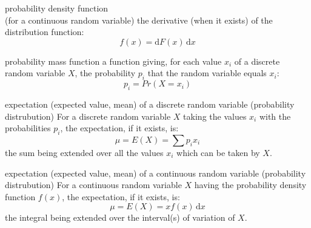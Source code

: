 \documentclass[avery5371,grid]{flashcards}
\begin{document}
\begin{flashcard}[Definition]{probability density function \\ (for a continuous random variable)}
\vspace{\fill}
    the derivative (when it exists) of the distribution function:
    \begin{equation*}
        f(x) = \mathrm{d}F(x)\,\mathrm{d}x
    \end{equation*}
\vspace{\fill}
\end{flashcard}

\begin{flashcard}[Definition]{probability mass function}
\vspace{\fill}
    a function giving, for each value $x_i$ of a discrete random variable $X$,
        the probability $p_i$ that the random variable equals $x_i$:
    \begin{equation*}
        p_i = Pr( X = x_i )
    \end{equation*}
\vspace{\fill}
\end{flashcard}

\begin{flashcard}[Definition]{expectation (expected value, mean) of a discrete random variable (probability distrubution)}
\vspace{\fill}
    For a discrete random variable $X$ taking the values $x_i$ with the probabilities $p_i$, the expectation, if it exists, is:
    \begin{equation*}
        \mu = E(X) = \sum p_i x_i
    \end{equation*}
    the sum being extended over all the values $x_i$ which can be taken by $X$.
\vspace{\fill}
\end{flashcard}

\begin{flashcard}[Definition]{expectation (expected value, mean) of a continuous random variable (probability distrubution)}
\vspace{\fill}
    For a continuous random variable $X$ having the probability density function $f(x)$, the expectation, if it exists, is:
    \begin{equation*}
        \mu = E(X) = x f(x)\,\mathrm{d}x
    \end{equation*}
    the integral being extended over the interval(s) of variation of $X$.
\vspace{\fill}
\end{flashcard}
\end{document}
